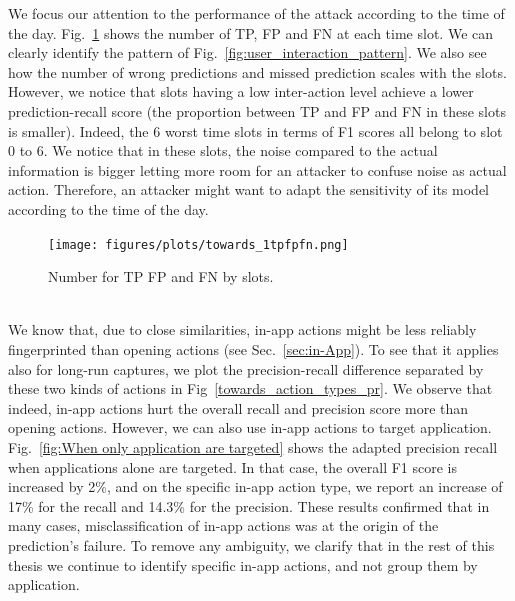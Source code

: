  We focus our attention to the performance of the attack according to the time of the day. Fig.~\ref{fig:towards_by_slots} shows the number of TP, FP and FN at each time slot. We can clearly identify the pattern of Fig.~\ref{fig:user_interaction_pattern}. We also see how the number of wrong predictions and missed prediction scales with the slots. However, we notice that slots having a low inter-action level achieve a lower prediction-recall score (the proportion between TP and FP and FN in these slots is smaller). Indeed, the 6 worst time slots in terms of F1 scores all belong to slot 0 to 6. We notice that in these slots, the noise compared to the actual information is bigger letting more room for an attacker to confuse noise as actual action. Therefore, an attacker might want to adapt the sensitivity of its model according to the time of the day. 
 
 
\begin{figure}[ht]
 \centering
 \texttt{[image: figures/plots/towards\_1tpfpfn.png]}
 \caption{Number for TP FP and FN by slots.}
  \label{fig:towards_by_slots}
\end{figure}
 \\
 

 
 
 
 

  
We know that, due to close similarities, in-app actions might be less reliably fingerprinted than opening actions (see Sec.~\ref{sec:in-App}). To see that it applies also for long-run captures, we plot the precision-recall difference separated by these two kinds of actions in Fig~\ref{towards_action_types_pr}. We observe that indeed, in-app actions hurt the overall recall and precision score more than opening actions. However, we can also use in-app actions to target application. Fig.~\ref{fig:When only application are targeted} shows the adapted precision recall when applications alone are targeted. In that case, the overall F1 score is increased by 2\%, and on the specific in-app action type, we report an increase of 17\% for the recall and 14.3\% for the precision. These results confirmed that in many cases, misclassification of in-app actions was at the origin of the prediction's failure. To remove any ambiguity, we clarify that in the rest of this thesis we continue to identify specific in-app actions, and not group them by application.


